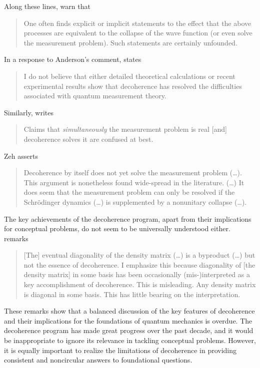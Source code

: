 \documentclass[rmp,aps,amsmath,amsfonts,noshowkeys,noshowpacs,12pt]{revtex4}
\begin{document}
%
Along these lines, \citet[p.~5]{Kiefer:1998:rz} warn that
%
\begin{quote} {\small 
    One often finds explicit or implicit statements
    to the effect that the above processes are equivalent to the
    collapse of the wave function (or even solve the measurement
    problem). Such statements are certainly unfounded.
}\end{quote}
%
In a response to Anderson's \citeyearpar[p.~492]{Anderson:2001:rc}
comment, \citet[p.~136]{Adler:2001:us} states
%
\begin{quote} {\small
  I do not believe that either detailed theoretical calculations or
  recent experimental results show that decoherence has resolved the
  difficulties associated with quantum measurement theory.
}\end{quote}
%
Similarly, \citet[p.~3]{Bacciagaluppi:2003:az} writes
%
\begin{quote} {\small 
  Claims that \emph{simultaneously} the measurement problem is real
  [and] decoherence solves it are confused at best.
}\end{quote}
%
Zeh asserts \cite[Ch.~2]{Joos:2003:jh}
%
\begin{quote} {\small
  Decoherence by itself does not yet solve the measurement
  problem (\dots). This argument is nonetheless found wide-spread in
  the literature. (\dots) It does seem that the measurement problem
  can only be resolved if the Schr\"odinger dynamics (\dots) is
  supplemented by a nonunitary collapse (\dots).
}\end{quote}
%
The key achievements of the decoherence program, apart from their
implications for conceptual problems, do not seem to be universally
understood either. \citet[p.~1800]{Zurek:1998:re} remarks
%
\begin{quote} {\small
  [The] eventual diagonality of the density matrix (\dots) is a
  byproduct (\dots) but not the essence of decoherence.  I emphasize
  this because diagonality of [the density matrix] in some basis has
  been occasionally (mis-)interpreted as a key accomplishment of
  decoherence. This is misleading. Any density matrix is diagonal in
  some basis. This has little bearing on the interpretation.
}\end{quote}
%
These remarks show that a balanced discussion of the key features of
decoherence and their implications for the foundations of quantum
mechanics is overdue. The decoherence program has made great progress
over the past decade, and it would be inappropriate to ignore its
relevance in tackling conceptual problems. However, it is equally
important to realize the limitations of decoherence in providing
consistent and noncircular answers to foundational questions.
\end{document}
